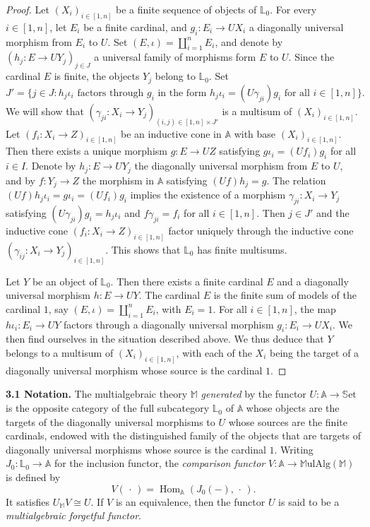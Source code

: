\documentclass{article}
\newenvironment{rmenv}[1]
  {\phantomsection\par\medskip\noindent\textbf{#1.}\rmfamily}
  {\medskip}
\newcommand{\bb}[1]{{\mathbb{#1}}}
\newcommand{\Set}{\mathbb{S}\mathrm{et}}
\newcommand{\MulAlg}{\mathbb{M}\mathrm{ulAlg}}
\DeclareMathOperator{\Hom}{Hom}
\newcommand{\oldpage}[1]{\marginpar{\footnotesize$\Big\vert$ \textit{p.~#1}}}
\begin{document}
\begin{proof}
  Let $(X_i)_{i\in[1,n]}$ be a finite sequence of objects of $\bb{L}_0$.
  For every $i\in[1,n]$, let $E_i$ be a finite cardinal, and $g_i\colon E_i\to UX_i$ a diagonally universal morphism from $E_i$ to $U$.
  Set $(E,\iota)=\coprod_{i=1}^nE_i$, and denote by $(h_j\colon E\to UY_j)_{j\in J}$ a universal family of morphisms form $E$ to $U$.
  Since the cardinal $E$ is finite, the objects $Y_j$ belong to $\bb{L}_0$.
  Set
  \[
    J' =
    \big\{
      j\in J
      :
      \mbox{$h_j\iota_i$ factors through $g_i$ in the form $h_j\iota_i=(U\gamma_{ji})g_i$ for all $i\in[1,n]$}
    \big\}.
  \]
  We will show that $(\gamma_{ji}\colon X_i\to Y_j)_{(i,j)\in[1,n]\times J'}$ is a multisum of $(X_i)_{i\in[1,n]}$.
  Let $(f_i\colon X_i\to Z)_{i\in[1,n]}$ be an inductive cone in $\bb{A}$ with base $(X_i)_{i\in[1,n]}$.
  Then there exists a unique morphism $g\colon E\to UZ$ satisfying $g\iota_i=(Uf_i)g_i$ for all $i\in I$.
  Denote by $h_j\colon E\to UY_j$ the diagonally universal morphism from $E$ to $U$, and by $f\colon Y_j\to Z$ the morphism in $\bb{A}$ satisfying $(Uf)h_j=g$.
  The relation $(Uf)h_j\iota_i=g\iota_i=(Uf_i)g_i$ implies the existence of a morphism $\gamma_{ji}\colon X_i\to Y_j$ satisfying $(U\gamma_{ji})g_i=h_j\iota_i$ and $f\gamma_{ji}=f_i$ for all $i\in[1,n]$.
  Then $j\in J'$ and the inductive cone $(f_i\colon X_i\to Z)_{i\in[1,n]}$ factor uniquely through the inductive cone $(\gamma_{ij}\colon X_i\to Y_j)_{i\in[1,n]}$.
  This shows that $\bb{L}_0$ has finite multisums.

  Let $Y$ be an object of $\bb{L}_0$.
  Then there exists a finite cardinal $E$ and a diagonally universal morphism $h\colon E\to UY$.
  The cardinal $E$ is the finite sum of models of the cardinal $1$,
\oldpage{201}
  say $(E,\iota)=\coprod_{i=1}^nE_i$, with $E_i=1$.
  For all $i\in[1,n]$, the map $h\iota_i\colon E_i\to UY$ factors through a diagonally universal morphism $g_i\colon E_i\to UX_i$.
  We then find ourselves in the situation described above.
  We thus deduce that $Y$ belongs to a multisum of $(X_i)_{i\in[1,n]}$, with each of the $X_i$ being the target of a diagonally universal morphism whose source is the cardinal $1$.
\end{proof}

\begin{rmenv}{3.1 Notation}
\label{3.1}
  The multialgebraic theory $\bb{M}$ \emph{generated} by the functor $U\colon\bb{A}\to\Set$ is the opposite category of the full subcategory $\bb{L}_0$ of $\bb{A}$ whose objects are the targets of the diagonally universal morphisms to $U$ whose sources are the finite cardinals, endowed with the distinguished family of the objects that are targets of diagonally universal morphisms whose source is the cardinal $1$.
  Writing $J_0\colon\bb{L}_0\to\bb{A}$ for the inclusion functor, the \emph{comparison functor} $V\colon\bb{A}\to\MulAlg(\bb{M})$ is defined by
  \[
    V(\,\cdot\,) = \Hom_\bb{A}(J_0(-),\,\cdot\,).
  \]
  It satisfies $U_\bb{M}V\cong U$.
  If $V$ is an equivalence, then the functor $U$ is said to be a \emph{multialgebraic forgetful functor}.
\end{rmenv}
\end{document}
